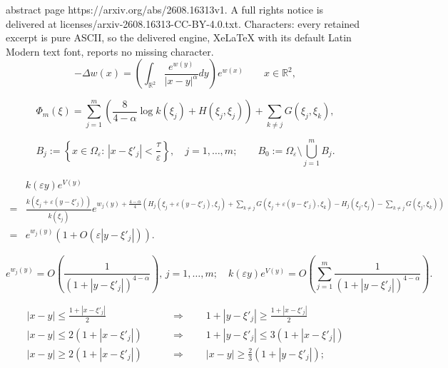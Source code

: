 \documentclass[10pt,a4paper]{amsart}
\begin{document}
abstract page https://arxiv.org/abs/2608.16313v1. A full rights notice is delivered at licenses/arxiv-2608.16313-CC-BY-4.0.txt. Characters: every retained excerpt is pure ASCII, so the delivered engine, XeLaTeX with its default Latin Modern text font, reports no missing character.
\begin{equation}\label{eq. limit problem}
-\Delta w(x)=\left(\int_{\mathbb R^2}\frac{e^{w(y)}}{|x-y|^\alpha}dy\right)e^{w(x)}\qquad x\in\mathbb R^2,
\end{equation}

\begin{equation}\label{phi}
\boxed{\Phi_m(\xi)=\sum_{j=1}^m\left(\frac8{4-\alpha}\log k(\xi_j)+H(\xi_j,\xi_j)\right)+\sum_{k\ne j}G(\xi_j,\xi_k),}
\end{equation}

\begin{equation}\label{bj}
B_j:=\left\{x\in\Omega_\varepsilon:\,\left|x-\xi'_j\right|<\frac\tau\varepsilon\right\},\quad j=1,\dots,m;\qquad B_0:=\Omega_\varepsilon\setminus\bigcup_{j=1}^mB_j.
\end{equation}

\begin{align}
\nonumber&k(\varepsilon y)e^{V(y)}\\
\nonumber=&\frac{k\left(\xi_j+\varepsilon\left(y-\xi'_j\right)\right)}{k(\xi_j)}e^{w_j(y)+\frac{4-\alpha}4\left(H_j\left(\xi_j+\varepsilon\left(y-\xi'_j\right),\xi_j\right)+\sum_{k\ne j}G\left(\xi_j+\varepsilon\left(y-\xi'_j\right),\xi_k\right)-H_j(\xi_j,\xi_j)-\sum_{k\ne j}G(\xi_j,\xi_k)\right)}\\
\label{eq. in ball}=&e^{w_j(y)}\left(1+O\left(\varepsilon\left|y-\xi'_j\right|\right)\right).
\end{align}

\begin{equation}\label{eq. out ball}
e^{w_j(y)}=O\left(\frac1{\left(1+\left|y-\xi'_j\right|\right)^{4-\alpha}}\right),\,j=1,\dots,m;\quad k(\varepsilon y)e^{V(y)}=O\left(\sum_{j=1}^m\frac1{\left(1+\left|y-\xi'_j\right|\right)^{4-\alpha}}\right).
\end{equation}

\begin{align}
\nonumber|x-y|\le\frac{1+\left|x-\xi'_j\right|}2\qquad&\Rightarrow\qquad1+\left|y-\xi'_j\right|\ge\frac{1+\left|x-\xi'_j\right|}2\\
\nonumber|x-y|\le2\left(1+\left|x-\xi'_j\right|\right)\qquad&\Rightarrow\qquad1+\left|y-\xi'_j\right|\le3\left(1+\left|x-\xi'_j\right|\right)\\
\label{triang}|x-y|\ge2\left(1+\left|x-\xi'_j\right|\right)\qquad&\Rightarrow\qquad|x-y|\ge\frac23\left(1+\left|y-\xi'_j\right|\right);
\end{align}
\end{document}
